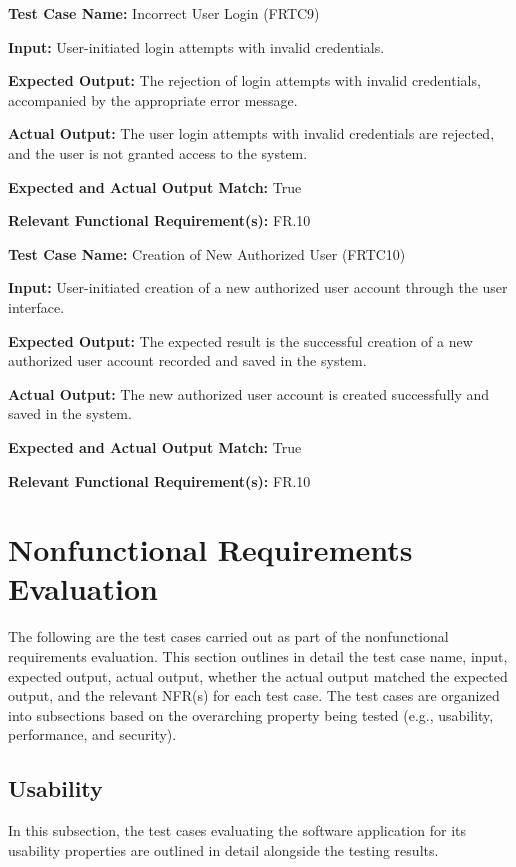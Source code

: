 \documentclass[12pt, titlepage]{article}
\begin{document}
\begin{mdframed}[linewidth=0.5mm]
  \textbf{Test Case Name:} Incorrect User Login (FRTC9) \par
  \textbf{Input:} User-initiated login attempts with invalid credentials. \par
  \textbf{Expected Output:} The rejection of login attempts with invalid credentials, accompanied by the appropriate error message. \par
  \textbf{Actual Output:} The user login attempts with invalid credentials are rejected, and the user is not granted access to the system. \par
  \textbf{Expected and Actual Output Match:} True \par
  \textbf{Relevant Functional Requirement(s):} FR.10
\end{mdframed}

\begin{mdframed}[linewidth=0.5mm]
  \textbf{Test Case Name:} Creation of New Authorized User (FRTC10) \par
  \textbf{Input:} User-initiated creation of a new authorized user account through the user interface. \par
  \textbf{Expected Output:} The expected result is the successful creation of a new authorized user account recorded and saved in the system. \par
  \textbf{Actual Output:} The new authorized user account is created successfully and saved in the system. \par
  \textbf{Expected and Actual Output Match:} True \par
  \textbf{Relevant Functional Requirement(s):} FR.10
\end{mdframed}

\section{Nonfunctional Requirements Evaluation}
The following are the test cases carried out as part of the nonfunctional requirements evaluation. This section outlines in detail the test case name, input, expected output, actual output, whether the actual output matched the expected output, and the relevant NFR(s) for each test case. The test cases are organized into subsections based on the overarching property being tested (e.g., usability, performance, and security).

\subsection{Usability}
In this subsection, the test cases evaluating the software application for its usability properties are outlined in detail alongside the testing results. \\
\end{document}
